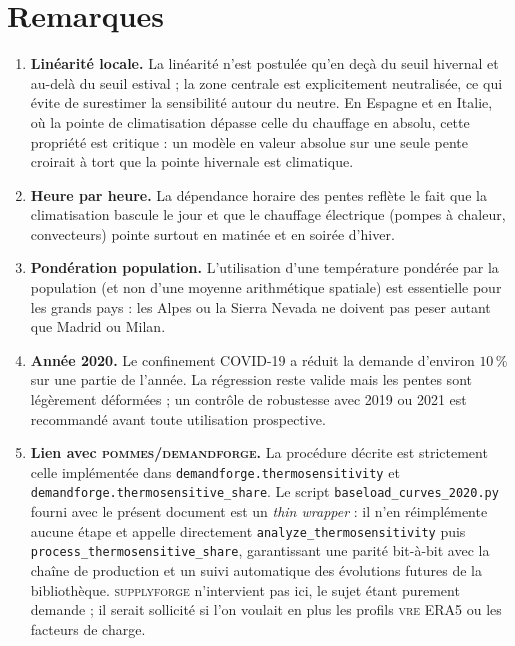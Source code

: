 \documentclass[11pt,a4paper]{article}
\begin{document}
\section{Remarques}

\begin{enumerate}
  \item \textbf{Lin\'earit\'e locale.} La lin\'earit\'e n'est postul\'ee qu'en de\c{c}\`a du seuil hivernal et au-del\`a du seuil estival ; la zone centrale est explicitement neutralis\'ee, ce qui \'evite de surestimer la sensibilit\'e autour du neutre. En Espagne et en Italie, o\`u la pointe de climatisation d\'epasse celle du chauffage en absolu, cette propri\'et\'e est critique : un mod\`ele en valeur absolue sur une seule pente croirait \`a tort que la pointe hivernale est climatique.
  \item \textbf{Heure par heure.} La d\'ependance horaire des pentes refl\`ete le fait que la climatisation bascule le jour et que le chauffage \'electrique (pompes \`a chaleur, convecteurs) pointe surtout en matin\'ee et en soir\'ee d'hiver.
  \item \textbf{Pond\'eration population.} L'utilisation d'une temp\'erature pond\'er\'ee par la population (et non d'une moyenne arithm\'etique spatiale) est essentielle pour les grands pays : les Alpes ou la Sierra Nevada ne doivent pas peser autant que Madrid ou Milan.
  \item \textbf{Ann\'ee 2020.} Le confinement COVID-19 a r\'eduit la demande d'environ $10\,\%$ sur une partie de l'ann\'ee. La r\'egression reste valide mais les pentes sont l\'eg\`erement d\'eform\'ees ; un contr\^ole de robustesse avec 2019 ou 2021 est recommand\'e avant toute utilisation prospective.
  \item \textbf{Lien avec \textsc{pommes}/\textsc{demandforge}.} La proc\'edure d\'ecrite est strictement celle impl\'ement\'ee dans \texttt{demandforge.thermosensitivity} et \texttt{demandforge.thermosensitive\_share}. Le script \texttt{baseload\_curves\_2020.py} fourni avec le pr\'esent document est un \emph{thin wrapper} : il n'en r\'eimpl\'emente aucune \'etape et appelle directement \texttt{analyze\_thermosensitivity} puis \texttt{process\_thermosensitive\_share}, garantissant une parit\'e bit-\`a-bit avec la cha\^ine de production et un suivi automatique des \'evolutions futures de la biblioth\`eque. \textsc{supplyforge} n'intervient pas ici, le sujet \'etant purement demande ; il serait sollicit\'e si l'on voulait en plus les profils \textsc{vre} ERA5 ou les facteurs de charge.
\end{enumerate}
\end{document}

